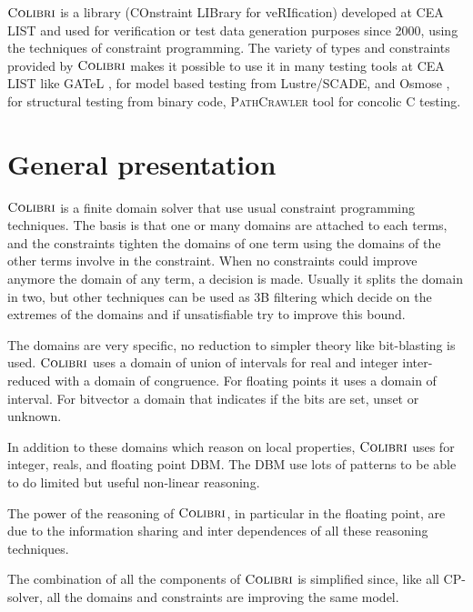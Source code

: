 \documentclass[a4paper]{article}
\title{\COLIBRI}
\author{Bruno Marre\and Benjamin Blanc\and Patricia Mouy\and Zakaria Chihani\and
  Franck Vedrine\and François Bobot}
\newcommand{\PathCrawler}{\textsc{Path\-Crawler}\xspace}
\newcommand{\COLIBRI}{\ensuremath{\mbox{\scshape Colibri}}\xspace}
\begin{document}
\maketitle

\COLIBRI{}  is a library
(COnstraint LIBrary for ve\-RI\-fi\-cation) developed at
CEA LIST and used for verification or test data generation purposes
since 2000, using the techniques of constraint programming.
The variety of types and constraints provided by \COLIBRI{} makes it possible to
use it in many testing  tools at CEA LIST like GATeL \cite{gatelMBT10}, for model based
testing from Lustre/SCADE, and Osmose \cite{BardinH08},
for structural testing from binary code, \PathCrawler{} tool for
concolic C testing.

\section{General presentation}\label{SubsecColibriGeneral}

\COLIBRI{} is a finite domain solver that use usual constraint
programming techniques. The basis is that one or many domains are
attached to each terms, and the constraints tighten the domains of one
term using the domains of the other terms involve in the constraint.
When no constraints could improve anymore the domain of any term, a
decision is made. Usually it splits the domain in two, but other
techniques can be used as 3B filtering which decide on the extremes of
the domains and if unsatisfiable try to improve this bound.

The domains are very specific, no reduction to simpler theory like
bit-blasting is used. \COLIBRI uses a domain of union of intervals for
real and integer inter-reduced with a domain of congruence. For
floating points it uses a domain of interval. For bitvector a domain
that indicates if the bits are set, unset or unknown.

In addition to these domains which reason on local properties, \COLIBRI
uses for integer, reals, and floating point DBM. The DBM use lots of
patterns to be able to do limited but useful non-linear reasoning.

The power of the reasoning of \COLIBRI, in particular in the floating
point, are due to the information sharing and inter dependences of all these
reasoning techniques.

The combination of all the components of \COLIBRI is simplified since,
like all CP-solver, all the domains and constraints are improving the
same model.
\end{document}
